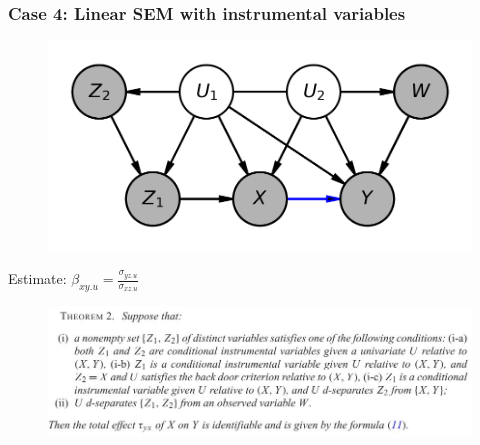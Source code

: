 \documentclass{beamer}
\begin{document}
\begin{frame}
\frametitle{Case 4: Linear SEM with instrumental variables}

    \begin{figure}
    	\centering
    	\includegraphics[scale=0.6]{scripts/instrumental_var.png}
    \end{figure}

    Estimate: $ \beta_{xy.u} = \frac{\sigma_{yz.u}}{\sigma_{xz.u}} $

    \begin{figure}
    	\centering
    	\includegraphics[scale=0.6]{scripts/theorem.png}
    \end{figure}

\end{frame}
\end{document}
